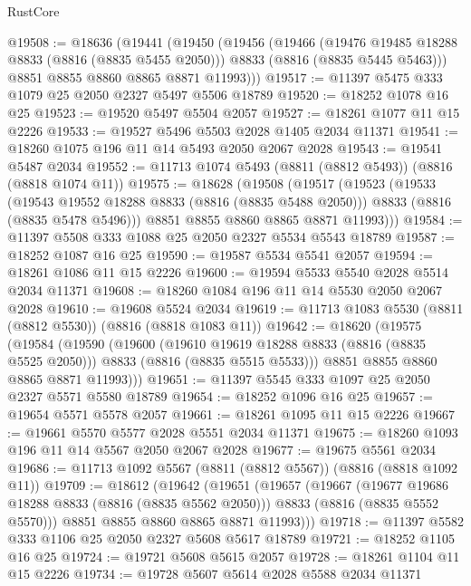 \begin{lexlean}{RustCore}
\begin{coremodule}
@19508 := @18636
    (@19441
      (@19450
        (@19456
          (@19466
            (@19476 @19485 @18288 @8833 (@8816 (@8835 @5455 @2050)))
            @8833
            (@8816 (@8835 @5445 @5463)))
          @8851
          @8855
          @8860
          @8865
          @8871
          @11993)))
@19517 := @11397 @5475 @333 @1079 @25 @2050 @2327 @5497 @5506 @18789
@19520 := @18252 @1078 @16 @25
@19523 := @19520 @5497 @5504 @2057
@19527 := @18261 @1077 @11 @15 @2226
@19533 := @19527 @5496 @5503 @2028 @1405 @2034 @11371
@19541 := @18260 @1075 @196 @11 @14 @5493 @2050 @2067 @2028
@19543 := @19541 @5487 @2034
@19552 := @11713 @1074 @5493 (@8811 (@8812 @5493)) (@8816 (@8818 @1074 @11))
@19575 := @18628
    (@19508
      (@19517
        (@19523
          (@19533
            (@19543 @19552 @18288 @8833 (@8816 (@8835 @5488 @2050)))
            @8833
            (@8816 (@8835 @5478 @5496)))
          @8851
          @8855
          @8860
          @8865
          @8871
          @11993)))
@19584 := @11397 @5508 @333 @1088 @25 @2050 @2327 @5534 @5543 @18789
@19587 := @18252 @1087 @16 @25
@19590 := @19587 @5534 @5541 @2057
@19594 := @18261 @1086 @11 @15 @2226
@19600 := @19594 @5533 @5540 @2028 @5514 @2034 @11371
@19608 := @18260 @1084 @196 @11 @14 @5530 @2050 @2067 @2028
@19610 := @19608 @5524 @2034
@19619 := @11713 @1083 @5530 (@8811 (@8812 @5530)) (@8816 (@8818 @1083 @11))
@19642 := @18620
    (@19575
      (@19584
        (@19590
          (@19600
            (@19610 @19619 @18288 @8833 (@8816 (@8835 @5525 @2050)))
            @8833
            (@8816 (@8835 @5515 @5533)))
          @8851
          @8855
          @8860
          @8865
          @8871
          @11993)))
@19651 := @11397 @5545 @333 @1097 @25 @2050 @2327 @5571 @5580 @18789
@19654 := @18252 @1096 @16 @25
@19657 := @19654 @5571 @5578 @2057
@19661 := @18261 @1095 @11 @15 @2226
@19667 := @19661 @5570 @5577 @2028 @5551 @2034 @11371
@19675 := @18260 @1093 @196 @11 @14 @5567 @2050 @2067 @2028
@19677 := @19675 @5561 @2034
@19686 := @11713 @1092 @5567 (@8811 (@8812 @5567)) (@8816 (@8818 @1092 @11))
@19709 := @18612
    (@19642
      (@19651
        (@19657
          (@19667
            (@19677 @19686 @18288 @8833 (@8816 (@8835 @5562 @2050)))
            @8833
            (@8816 (@8835 @5552 @5570)))
          @8851
          @8855
          @8860
          @8865
          @8871
          @11993)))
@19718 := @11397 @5582 @333 @1106 @25 @2050 @2327 @5608 @5617 @18789
@19721 := @18252 @1105 @16 @25
@19724 := @19721 @5608 @5615 @2057
@19728 := @18261 @1104 @11 @15 @2226
@19734 := @19728 @5607 @5614 @2028 @5588 @2034 @11371

\end{coremodule}
\end{lexlean}
